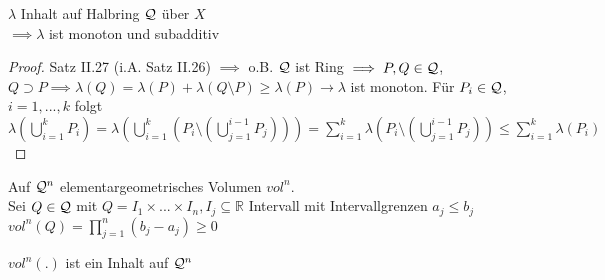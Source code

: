   \begin{lemma}[i.A. II.27]
    $\lambda$ Inhalt auf Halbring $\mathcal{Q}$ über $X$\\
    $\implies \lambda$ ist monoton und subadditiv
  \end{lemma}

  \begin{proof}
    Satz II.27 (i.A. Satz II.26) $\implies$ o.B. $\mathcal{Q}$ ist Ring \newline
    $\implies P,Q\in\mathcal{Q}$, $Q\supset P \implies \lambda(Q) = \lambda(P) + \lambda(Q\setminus P) \geq \lambda(P) \rightarrow \lambda$ ist monoton. \newline
    Für $P_i\in\mathcal{Q}$, $i=1,...,k$ folgt \newline $\lambda(\bigcup\limits_{i=1}^{k}P_i) = \lambda(\bigcup\limits_{i=1}^{k}(P_i\setminus (\bigcup\limits_{j=1}^{i-1}P_j))) = \sum\limits_{i=1}^{k}\lambda(P_i\setminus (\bigcup\limits_{j=1}^{i-1}P_j)) \leq \sum\limits_{i=1}^{k}\lambda(P_i)$
  \end{proof}

  \begin{example}
    Auf $\mathcal{Q}^n$ elementargeometrisches Volumen $vol^n$.\\
    Sei $Q \in \mathcal{Q}$ mit $Q = I_1 \times ... \times I_n, I_j \subseteq \mathbb{R}$ Intervall mit Intervallgrenzen $a_j \leq b_j$\\
    $vol^n(Q) = \prod\limits_{j=1}^n (b_j - a_j) \geq 0$
  \end{example}

  \begin{theorem}[i.A. II.28]
    $vol^n(.)$ ist ein Inhalt auf $\mathcal{Q}^n$
  \end{theorem}

